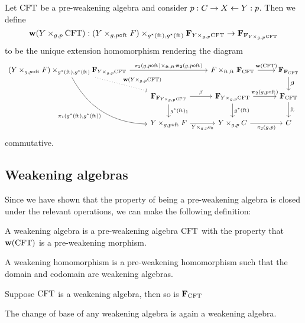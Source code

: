 \begin{defn}
Let $\mathrm{CFT}$ be a pre-weakening algebra and consider $p:C\rightarrow X\leftarrow Y:p$.
Then we define
\begin{equation*}
\mathbf{w}(\cobesys{Y}{\stesys}{g}{p})
  :
\cobesys
  { (\pullback{Y}{\stesysf}{g}{p\circ\eft})}
  { \famesys{\cobesys{Y}{\stesys}{g}{p}}}
  { g^\ast(\eft)}
  { g^\ast(\eft)}
  \to
\famesys{\famesys{\cobesys{Y}{\stesys}{g}{p}}}
\end{equation*}
to be the unique extension homomorphism rendering the diagram
\begin{equation*}
\begin{tikzcd}
\cobesys
  { \pullback{Y}{\stesysf}{g}{p\circ\eft}}
  { \famesys{\cobesys{Y}{\stesys}{g}{p}}}
  { g^\ast(\eft)}
  { g^\ast(\eft)}
  \ar[bend right]{ddr}[swap]{\pullbackpr{1}{g^\ast(\eft)}{g^\ast(\eft)}}
  \ar{rr}{%
    \pullback
      { \pullbackpr{2}{g}{p\circ\eft}}
      { \boldsymbol{\pi}_\mathbf{2}(g,p\circ\eft)}
      { \eft}
      { \eft}
    }
  \ar[dotted]{dr}{\mathbf{w}(\cobesys{Y}{\stesys}{g}{p})}
  &
  {}&
\cobesys{\stesysf}{\famesys{\stesys}}{\eft}{\eft}
  \ar{r}{\mathbf{w}(\stesys)}
  &
\famesys{\famesys{\stesys}}
  \ar{d}{\boldsymbol{\beta}}
  \\
  {}&
\famesys{\famesys{\cobesys{Y}{\stesys}{g}{p}}}
  \ar{r}{\beta}
  \ar{d}{g^\ast(\eft)_1}
  &
\famesys{\cobesys{Y}{\stesys}{g}{p}}
  \ar{r}{\boldsymbol{\pi}_2(g,p\circ\eft)}
  \ar{d}{g^\ast(\eft)}
  &
\famesys{\stesys}
  \ar{d}{\eft}
  \\
  {}&
\pullback{Y}{\stesysf}{g}{p\circ\eft}
  \ar{r}[swap]{\cobesys{Y}{\ectxext}{g}{p}}
  &
\pullback{Y}{\stesysc}{g}{p}
  \ar{r}[swap]{\pullbackpr{2}{g}{p}}
  &
\stesysc
\end{tikzcd}
\end{equation*}
commutative.
\end{defn}

\subsection{Weakening algebras}
Since we have shown that the property of being a pre-weakening algebra is closed
under the relevant operations, we can make the following definition:

\begin{defn}
A weakening algebra is a pre-weakening algebra $\mathrm{CFT}$ with the property that
$\mathbf{w}(\mathrm{CFT})$ is a pre-weakening morphism.
\end{defn}

\begin{defn}
A weakening homomorphism is a pre-weakening homomorphism such that the domain
and codomain are weakening algebras.
\end{defn}

\begin{thm}
Suppose $\mathrm{CFT}$ is a weakening algebra, then so is $\mathbf{F}_{\mathrm{CFT}}$
\end{thm}

\begin{thm}
The change of base of any weakening algebra is again a weakening algebra.
\end{thm}
